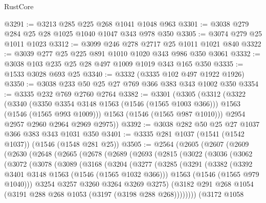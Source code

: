 \begin{lexlean}{RustCore}
\begin{coremodule}
@3291 := @3213 @285 @225 @268 @1041 @1048 @963
@3301 := @3038 @279 @284 @25 @28 @1025 @1040 @1047 @343 @978 @350
@3305 := @3074 @279 @25 @1011 @1023
@3312 := @3099 @246 @278 @2717 @25 @1011 @1021 @840
@3322 := @3039 @277 @25 @225 @891 @1010 @1020 @343 @986 @350 @3061
@3332 := @3038 @103 @235 @25 @28 @497 @1009 @1019 @343 @165 @350
@3335 := @1533 @3028 @693 @25
@3340 := @3332 (@3335 @102 @497 @1922 @1926)
@3350 := @3038 @233 @50 @25 @27 @769 @366 @383 @343 @1002 @350
@3354 := @3335 @232 @769 @2760 @2764
@3382 := @3301
    (@3305
      (@3312
        (@3322
          (@3340
            (@3350 @3354 @3148 @1563 (@1546 (@1565 @1003 @366)))
            @1563
            (@1546 (@1565 @993 @1009)))
          @1563
          (@1546 (@1565 @987 @1010)))
        @2954
        @2957
        @2960
        @2964
        @2969
        @2975))
@3392 := @3038 @282 @50 @25 @27 @1037 @366 @383 @343 @1031 @350
@3401 := @3335 @281 @1037 (@1541 (@1542 @1037)) (@1546 (@1548 @281 @25))
@3505 := @2564
    (@2605
      (@2607
        (@2609
          (@2630
            (@2648
              (@2665
                (@2678
                  (@2689
                    (@2693
                      (@2815
                        (@3022
                          (@3036
                            (@3062
                              (@3072
                                (@3078
                                  (@3089
                                    (@3168
                                      (@3204
                                        (@3277
                                          (@3285
                                            (@3291
                                              (@3382
                                                (@3392 @3401 @3148 @1563 (@1546 (@1565 @1032 @366)))
                                                @1563
                                                (@1546 (@1565 @979 @1040)))
                                              @3254
                                              @3257
                                              @3260
                                              @3264
                                              @3269
                                              @3275)
                                            (@3182
                                              @291
                                              @268
                                              @1054
                                              (@3191 @288 @268 @1053 (@3197 (@3198 @288 @268))))))))
                                    (@3172
                                      @1058

\end{coremodule}
\end{lexlean}
